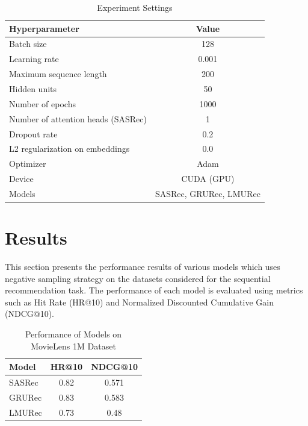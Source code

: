 \documentclass{article}
\begin{document}
\begin{table}[h!]
\centering
\caption{Experiment Settings}
\begin{tabular}{|l|c|}
\hline
\textbf{Hyperparameter}           & \textbf{Value} \\ \hline
Batch size                        & 128            \\ \hline
Learning rate                     & 0.001          \\ \hline
Maximum sequence length           & 200            \\ \hline
Hidden units                      & 50             \\ \hline

Number of epochs                  & 1000           \\ \hline
Number of attention heads (SASRec) & 1              \\ \hline
Dropout rate                      & 0.2            \\ \hline
L2 regularization on embeddings    & 0.0            \\ \hline
Optimizer                         & Adam           \\ \hline
Device                            & CUDA (GPU)     \\ \hline
Models                            & SASRec, GRURec, LMURec \\ \hline
\end{tabular}
\end{table}

\section{Results}

This section presents the performance results of various models which  uses negative sampling strategy on the datasets considered for the sequential recommendation task. The performance of each model is evaluated using metrics such as Hit Rate (HR@10) and Normalized Discounted Cumulative Gain (NDCG@10).


\begin{table}[h!]
\centering
\caption{Performance of Models on MovieLens 1M Dataset}
\begin{tabular}{|l|c|c|}
\hline
\textbf{Model} & \textbf{HR@10} & \textbf{NDCG@10} \\ \hline
SASRec         & 0.82          & 0.571             \\ \hline
GRURec         & 0.83           & 0.583             \\ \hline
LMURec         & 0.73           & 0.48             \\ \hline
\end{tabular}
\end{table}
\end{document}
